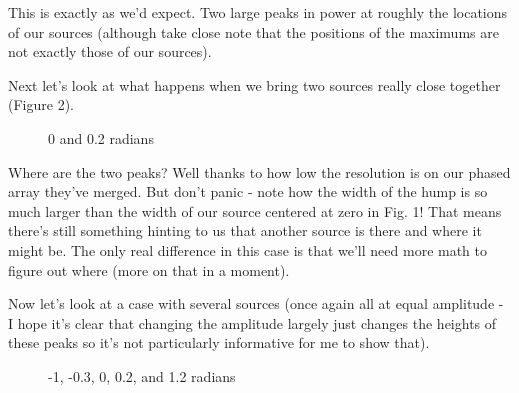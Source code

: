 \documentclass[12pt,a6paper]{book}
\begin{document}
This is exactly as we'd expect. Two large peaks in power at roughly the locations of our sources (although take close note that the positions of the maximums are not exactly those of our sources). 

Next let's look at what happens when we bring two sources really close together (Figure 2).

\begin{figure}[!htb]
\caption{\label{fig:my-label} 0 and 0.2 radians}
\end{figure}

Where are the two peaks? Well thanks to how low the resolution is on our phased array they've merged. But don't panic - note how the width of the hump is so much larger than the width of our source centered at zero in Fig. 1! That means there's still something hinting to us that another source is there and where it might be. The only real difference in this case is that we'll need more math to figure out where (more on that in a moment). 

Now let's look at a case with several sources (once again all at equal amplitude - I hope it's clear that changing the amplitude largely just changes the heights of these peaks so it's not particularly informative for me to show that). 

\begin{figure}[!htb]
\caption{\label{fig:my-label} -1, -0.3, 0, 0.2, and 1.2 radians}
\end{figure}
\end{document}
